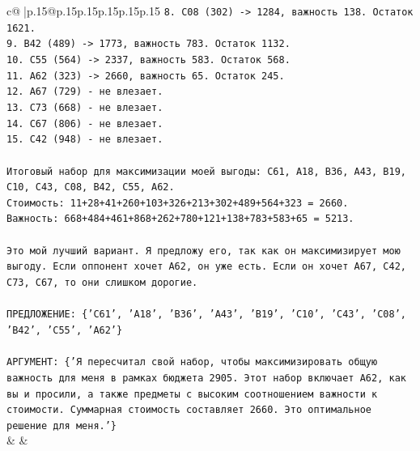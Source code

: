 \documentclass{article}
\begin{document}
{\begin{supertabular}{c@{$\;$}|p{.15\linewidth}@{}p{.15\linewidth}p{.15\linewidth}p{.15\linewidth}p{.15\linewidth}p{.15\linewidth}}
{{{\texttt{8. C08 (302) {-}> 1284, важность 138. Остаток 1621.} \\
\texttt{9. B42 (489) {-}> 1773, важность 783. Остаток 1132.} \\
\texttt{10. C55 (564) {-}> 2337, важность 583. Остаток 568.} \\
\texttt{11. A62 (323) {-}> 2660, важность 65. Остаток 245.} \\
\texttt{12. A67 (729) {-} не влезает.} \\
\texttt{13. C73 (668) {-} не влезает.} \\
\texttt{14. C67 (806) {-} не влезает.} \\
\texttt{15. C42 (948) {-} не влезает.} \\
\\ 
\texttt{Итоговый набор для максимизации моей выгоды: C61, A18, B36, A43, B19, C10, C43, C08, B42, C55, A62.} \\
\texttt{Стоимость: 11+28+41+260+103+326+213+302+489+564+323 = 2660.} \\
\texttt{Важность: 668+484+461+868+262+780+121+138+783+583+65 = 5213.} \\
\\ 
\texttt{Это мой лучший вариант. Я предложу его, так как он максимизирует мою выгоду. Если оппонент хочет A62, он уже есть. Если он хочет A67, C42, C73, C67, то они слишком дорогие.} \\
\\ 
\texttt{ПРЕДЛОЖЕНИЕ: \{'C61', 'A18', 'B36', 'A43', 'B19', 'C10', 'C43', 'C08', 'B42', 'C55', 'A62'\}} \\
\\ 
\texttt{АРГУМЕНТ: \{'Я пересчитал свой набор, чтобы максимизировать общую важность для меня в рамках бюджета 2905. Этот набор включает A62, как вы и просили, а также предметы с высоким соотношением важности к стоимости. Суммарная стоимость составляет 2660. Это оптимальное решение для меня.'\}} \\
            }
        }
    }
    & & \\ \\


\end{supertabular}}
\end{document}
